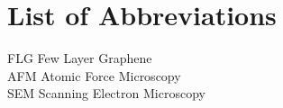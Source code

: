 \chapter*{List of Abbreviations}

\noindent

FLG \hfill Few Layer Graphene \\

AFM \hfill Atomic Force Microscopy \\

SEM \hfill Scanning Electron Microscopy \\

\newpage